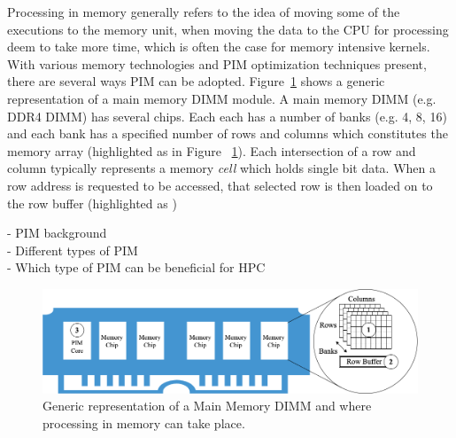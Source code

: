 Processing in memory generally refers to the idea of moving some of the executions to the memory unit, when moving the data to the CPU for processing deem to take more time, which is often the case for memory intensive kernels. With various memory technologies and PIM optimization techniques present, there are several ways PIM can be adopted. Figure~\ref{fig:pimcat} shows a generic representation of a main memory DIMM module. A main memory DIMM (e.g. DDR4 DIMM) has several chips. Each each has a number of banks (e.g. 4, 8, 16) and each bank has a specified number of rows and columns which constitutes the memory array (highlighted as  in Figure ~\ref{fig:pimcat}). Each intersection of a row and column typically represents a memory \textit{cell} which holds single bit data. When a row address is requested to be accessed, that selected row is then loaded on to the row buffer (highlighted as ) %







-	PIM background \\
-	Different types of PIM \\
-	Which type of PIM can be beneficial for HPC \\


\begin{figure}[t!]
\centering
\includegraphics[width=\columnwidth]{MEMSYS22/figures/pimcat.png}
\caption{Generic representation of a Main Memory DIMM and where processing in memory can take place.}
\label{fig:pimcat}
\end{figure}   


  